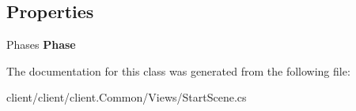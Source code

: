 \subsection*{Properties}
\begin{DoxyCompactItemize}
\item 
\hypertarget{classClient_1_1Common_1_1Views_1_1StartScene_abdd3214f601d66c9f235ff70ec097210}{Phases {\bfseries Phase}}\label{classClient_1_1Common_1_1Views_1_1StartScene_abdd3214f601d66c9f235ff70ec097210}

\end{DoxyCompactItemize}


The documentation for this class was generated from the following file\-:\begin{DoxyCompactItemize}
\item 
client/client/client.\-Common/\-Views/Start\-Scene.\-cs\end{DoxyCompactItemize}
